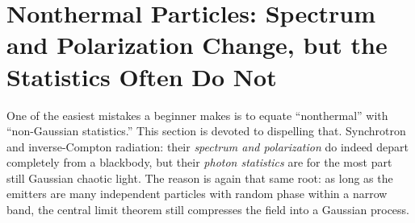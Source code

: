 \section{Nonthermal Particles: Spectrum and Polarization Change, but the Statistics Often Do Not}
\label{sec:e16-nonthermal}

One of the easiest mistakes a beginner makes is to equate ``nonthermal'' with ``non-Gaussian statistics.'' This section is devoted to dispelling that. Synchrotron and inverse-Compton radiation: their \emph{spectrum and polarization} do indeed depart completely from a blackbody, but their \emph{photon statistics} are for the most part still Gaussian chaotic light. The reason is again that same root: as long as the emitters are many independent particles with random phase within a narrow band, the central limit theorem still compresses the field into a Gaussian process.

